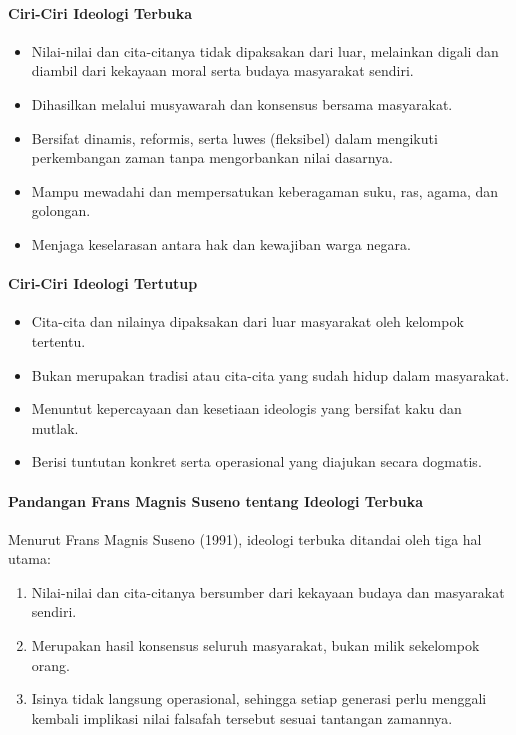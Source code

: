 \paragraph{Ciri-Ciri Ideologi Terbuka}
\begin{itemize}
\item Nilai-nilai dan cita-citanya tidak dipaksakan dari luar, melainkan digali dan diambil dari kekayaan moral serta budaya masyarakat sendiri.
\item Dihasilkan melalui musyawarah dan konsensus bersama masyarakat.
\item Bersifat dinamis, reformis, serta luwes (fleksibel) dalam mengikuti perkembangan zaman tanpa mengorbankan nilai dasarnya.
\item Mampu mewadahi dan mempersatukan keberagaman suku, ras, agama, dan golongan.
\item Menjaga keselarasan antara hak dan kewajiban warga negara.
\end{itemize}

\paragraph{Ciri-Ciri Ideologi Tertutup}
\begin{itemize}
\item Cita-cita dan nilainya dipaksakan dari luar masyarakat oleh kelompok tertentu.
\item Bukan merupakan tradisi atau cita-cita yang sudah hidup dalam masyarakat.
\item Menuntut kepercayaan dan kesetiaan ideologis yang bersifat kaku dan mutlak.
\item Berisi tuntutan konkret serta operasional yang diajukan secara dogmatis.
\end{itemize}

\paragraph{Pandangan Frans Magnis Suseno tentang Ideologi Terbuka}


Menurut Frans Magnis Suseno (1991), ideologi terbuka ditandai oleh tiga hal utama:
\begin{enumerate}
\item Nilai-nilai dan cita-citanya bersumber dari kekayaan budaya dan masyarakat sendiri.
\item Merupakan hasil konsensus seluruh masyarakat, bukan milik sekelompok orang.
\item Isinya tidak langsung operasional, sehingga setiap generasi perlu menggali kembali implikasi nilai falsafah tersebut sesuai tantangan zamannya.
\end{enumerate}

